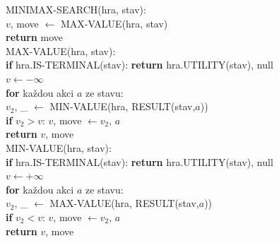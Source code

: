 \begin{algo}
\ttfamily\small
MINIMAX-SEARCH(hra, stav):\\
\hspace*{1.5em}$v$, move $\leftarrow$ MAX-VALUE(hra, stav) \\
\hspace*{1.5em}\textbf{return} move\\[3pt]
MAX-VALUE(hra, stav):\\
\hspace*{1.5em}\textbf{if} hra.IS-TERMINAL(stav): \textbf{return} hra.UTILITY(stav), null\\
\hspace*{1.5em}$v \leftarrow -\infty$\\
\hspace*{1.5em}\textbf{for} každou akci $a$ ze stavu:\\
\hspace*{3em}$v_2$, \_ $\leftarrow$ MIN-VALUE(hra, RESULT(stav,$a$))\\
\hspace*{3em}\textbf{if} $v_2 > v$: $v$, move $\leftarrow v_2$, $a$ \\
\hspace*{1.5em}\textbf{return} $v$, move\\[3pt]
MIN-VALUE(hra, stav):\\
\hspace*{1.5em}\textbf{if} hra.IS-TERMINAL(stav): \textbf{return} hra.UTILITY(stav), null\\
\hspace*{1.5em}$v \leftarrow +\infty$\\
\hspace*{1.5em}\textbf{for} každou akci $a$ ze stavu:\\
\hspace*{3em}$v_2$, \_ $\leftarrow$ MAX-VALUE(hra, RESULT(stav,$a$))\\
\hspace*{3em}\textbf{if} $v_2 < v$: $v$, move $\leftarrow v_2$, $a$ \\
\hspace*{1.5em}\textbf{return} $v$, move
\end{algo}

